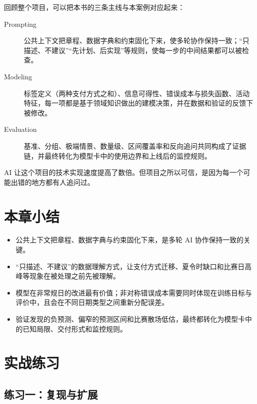回顾整个项目，可以把本书的三条主线与本案例对应起来：

\begin{description}
  \item[Prompting] 公共上下文把章程、数据字典和约束固化下来，使多轮协作保持一致；“只描述、不建议”“先计划、后实现”等规则，使每一步的中间结果都可以被检查。
  \item[Modeling] 标签定义（两种支付方式之和）、信息可得性、错误成本与损失函数、活动特征，每一项都是基于领域知识做出的建模决策，并在数据和验证的反馈下被修改。
  \item[Evaluation] 基准、分组、极端情景、数量级、区间覆盖率和反向追问共同构成了证据链，并最终转化为模型卡中的使用边界和上线后的监控规则。
\end{description}

AI 让这个项目的技术实现速度提高了数倍。但项目之所以可信，是因为每一个可能出错的地方都有人追问过。

\section{本章小结}

\begin{itemize}
  \item 公共上下文把章程、数据字典与约束固化下来，是多轮 AI 协作保持一致的关键。
  \item “只描述、不建议”的数据理解方式，让支付方式迁移、夏令时缺口和比赛日高峰等现象在被处理之前先被理解。
  \item 模型在非常规日的改进最有价值；非对称错误成本需要同时体现在训练目标与评价中，且会在不同日期类型之间重新分配误差。
  \item 验证发现的负预测、偏窄的预测区间和比赛散场低估，最终都转化为模型卡中的已知局限、交付形式和监控规则。
\end{itemize}

\section{实战练习}

\subsection*{练习一：复现与扩展}

